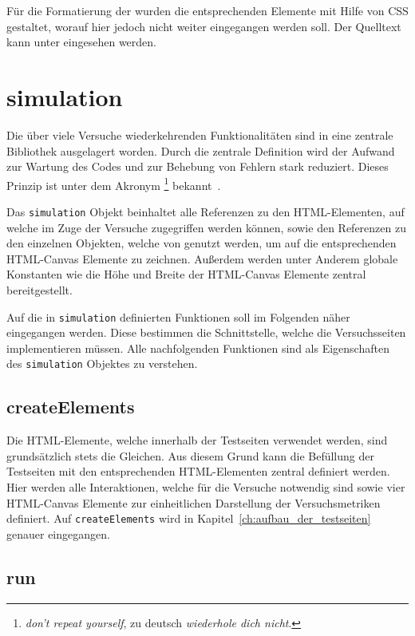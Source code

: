 Für die Formatierung der  wurden die entsprechenden Elemente mit Hilfe von CSS gestaltet, worauf hier jedoch nicht weiter eingegangen werden soll.
Der Quelltext kann unter  eingesehen werden.

\section{simulation}\label{ch:simulation_js}

Die über viele Versuche wiederkehrenden Funktionalitäten sind in eine zentrale Bibliothek ausgelagert worden.
Durch die zentrale Definition wird der Aufwand zur Wartung des Codes und zur Behebung von Fehlern stark reduziert.
Dieses Prinzip ist unter dem Akronym \footnote{\textit{don't repeat yourself}, zu deutsch \textit{wiederhole dich nicht}.} bekannt~\cite{AndrewHunt2021}.

Das \lstinline{simulation} Objekt beinhaltet alle Referenzen zu den HTML-Elementen, auf welche im Zuge der Versuche zugegriffen werden können, sowie den Referenzen zu den einzelnen  Objekten, welche von  genutzt werden, um auf die entsprechenden HTML-Canvas Elemente zu zeichnen.
Au{\ss}erdem werden unter Anderem globale Konstanten wie die Höhe und Breite der HTML-Canvas Elemente zentral bereitgestellt.

Auf die in \lstinline{simulation} definierten Funktionen soll im Folgenden näher eingegangen werden.
Diese bestimmen die Schnittstelle, welche die Versuchsseiten implementieren müssen.
Alle nachfolgenden Funktionen sind als Eigenschaften des \lstinline{simulation} Objektes zu verstehen.

\subsection{createElements}\label{ch:sim_createElements}

Die HTML-Elemente, welche innerhalb der Testseiten verwendet werden, sind grundsätzlich stets die Gleichen.
Aus diesem Grund kann die Befüllung der Testseiten mit den entsprechenden HTML-Elementen zentral definiert werden.
Hier werden alle Interaktionen, welche für die Versuche notwendig sind sowie vier HTML-Canvas Elemente zur einheitlichen Darstellung der Versuchsmetriken definiert.
Auf \lstinline{createElements} wird in Kapitel~\ref{ch:aufbau_der_testseiten} genauer eingegangen.

\subsection{run}\label{ch:sim_run}


